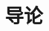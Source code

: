 \documentclass[../main.tex]{subfiles}
\begin{document}
\setcounter{chapter}{0}
\chapter{导论}\label{cha:introduction}
\biblio
\end{document}
